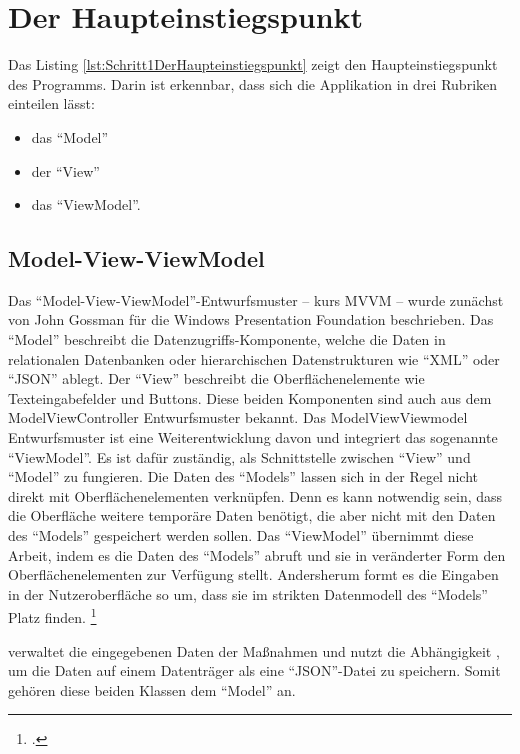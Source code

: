 \clearpage
\section{Der Haupteinstiegspunkt}

Das Listing \ref{lst:Schritt1DerHaupteinstiegspunkt} zeigt den Haupteinstiegspunkt des Programms.
Darin ist erkennbar, dass sich die Applikation in drei Rubriken einteilen lässt:
\begin{itemize}
  \item das \enquote{Model} 
  \item der \enquote{View} 
  \item das \enquote{ViewModel}. 
\end{itemize}



\subsection{Model-View-ViewModel}
Das \enquote{Model-View-ViewModel}-Entwurfsmuster -- kurs MVVM -- wurde zunächst von John Gossman für die Windows Presentation Foundation beschrieben.
Das \enquote{Model} beschreibt die Datenzugriffs-Komponente, welche die Daten in relationalen Datenbanken oder hierarchischen Datenstrukturen wie \enquote{XML} oder \enquote{JSON} ablegt.
Der \enquote{View} beschreibt die Oberflächenelemente wie Texteingabefelder und Buttons.
Diese beiden Komponenten sind auch aus dem ModelViewController Entwurfsmuster bekannt.
Das ModelViewViewmodel Entwurfsmuster ist eine Weiterentwicklung davon und integriert das sogenannte \enquote{ViewModel}.
Es ist dafür zuständig, als Schnittstelle zwischen \enquote{View} und \enquote{Model} zu fungieren.
Die Daten des \enquote{Models} lassen sich in der Regel nicht direkt mit Oberflächenelementen verknüpfen.
Denn es kann notwendig sein, dass die Oberfläche weitere temporäre Daten benötigt, die aber nicht mit den Daten des \enquote{Models} gespeichert werden sollen.
Das \enquote{ViewModel} übernimmt diese Arbeit, indem es die Daten des \enquote{Models} abruft und sie in veränderter Form den Oberflächenelementen zur Verfügung stellt.
Andersherum formt es die Eingaben in der Nutzeroberfläche so um, dass sie im strikten Datenmodell des \enquote{Models} Platz finden.
\footcite[Vgl.][]{IntroductionToModelViewViewModelPatternForBuildingWPFApps}

  verwaltet die eingegebenen Daten der Maßnahmen und nutzt die Abhängigkeit  , um die Daten auf einem Datenträger als eine \enquote{JSON}-Datei zu speichern.
Somit gehören diese beiden Klassen dem \enquote{Model} an.

